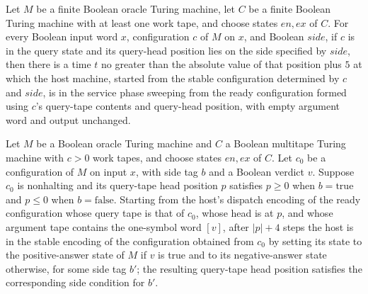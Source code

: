 \begin{theorem}
\label{Turing.oracleHost_prepare}
\leanok
{}
Let $M$ be a finite Boolean oracle Turing machine, let $C$ be a finite Boolean Turing
machine with at least one work tape, and choose states $en,ex$ of $C$. For every Boolean
input word $x$, configuration $c$ of $M$ on $x$, and Boolean $side$, if $c$ is in the
query state and its query-head position lies on the side specified by $side$, then there
is a time $t$ no greater than the absolute value of that position plus $5$ at which the
host machine, started from the stable configuration determined by $c$ and $side$, is in
the service phase sweeping from the ready configuration formed using $c$’s query-tape
contents and query-head position, with empty argument word and output unchanged.
\end{theorem}

\begin{theorem}
\label{Turing.oracleHost_restore}
\leanok
{}
Let $M$ be a Boolean oracle Turing machine and $C$ a Boolean multitape Turing machine
with $c>0$ work tapes, and choose states $en,ex$ of $C$. Let $c_0$ be a configuration of
$M$ on input $x$, with side tag $b$ and a Boolean verdict $v$. Suppose $c_0$ is
nonhalting and its query-tape head position $p$ satisfies $p\ge0$ when $b=\mathrm{true}$
and $p\le0$ when $b=\mathrm{false}$. Starting from the host's dispatch encoding of the
ready configuration whose query tape is that of $c_0$, whose head is at $p$, and whose
argument tape contains the one-symbol word $[v]$, after $|p|+4$ steps the host is in the
stable encoding of the configuration obtained from $c_0$ by setting its state to the
positive-answer state of $M$ if $v$ is true and to its negative-answer state otherwise,
for some side tag $b'$; the resulting query-tape head position satisfies the
corresponding side condition for $b'$.
\end{theorem}

